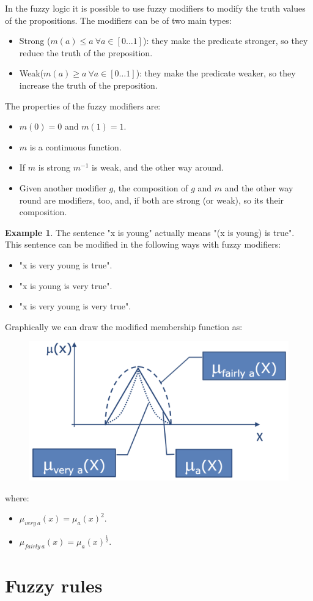 \documentclass[12pt, a4paper]{report}
\theoremstyle{remark}
\theoremstyle{definition}
\newtheorem{example}{Example}
\begin{document}
    In the fuzzy logic it is possible to use fuzzy modifiers to modify the truth values of the propositions.     
    The modifiers can be of two main types: 
    \begin{itemize}
        \item Strong ($m(a) \leq a \: \forall a \in [0 \dots 1]$): they make the predicate stronger, so they reduce the truth of the preposition.
        \item Weak($m(a) \geq a \: \forall a \in [0 \dots 1]$): they make the predicate weaker, so they increase the truth of the preposition.
    \end{itemize}
    The properties of the fuzzy modifiers are:
    \begin{itemize}
        \item $m(0)=0$ and $m(1)=1$.
        \item $m$ is a continuous function. 
        \item If $m$ is strong $m^{-1}$ is weak, and the other way around.
        \item Given another modifier $g$, the composition of $g$ and $m$ and the other way round are modifiers, too, and, if both are strong
            (or weak), so its their composition.
    \end{itemize}
    \begin{example}
        The sentence "x is young" actually means "(x is young) is true". This sentence can be modified in the following ways with fuzzy modifiers:
        \begin{itemize}
            \item "x is very young is true".
            \item "x is young is very true".
            \item "x is very young is very true". 
        \end{itemize}
        Graphically we can draw the modified membership function as: 
        \begin{figure}[H]
            \centering
            \includegraphics[width=0.4\linewidth]{images/modifiers.png}
        \end{figure}
        where: 
        \begin{itemize}
            \item $\mu_{very \: a}(x)=\mu_a(x)^2$.
            \item $\mu_{fairly \: a}(x)=\mu_a(x)^{\frac{1}{2}}$.
        \end{itemize}
    \end{example}








     

    \newpage

    \chapter{Fuzzy rules}
    
\end{document}
